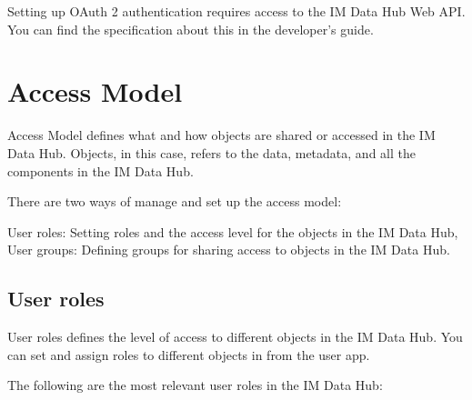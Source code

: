 \documentclass[]{book}
\begin{document}
Setting up OAuth 2 authentication requires access to the IM Data Hub Web API. You can find the specification about this in the developer's guide.

\hypertarget{access-model}{%
\section{Access Model}\label{access-model}}

Access Model defines what and how objects are shared or accessed in the IM Data Hub. Objects, in this case, refers to the data, metadata, and all the components in the IM Data Hub.

There are two ways of manage and set up the access model:

User roles: Setting roles and the access level for the objects in the IM Data Hub,
User groups: Defining groups for sharing access to objects in the IM Data Hub.

\hypertarget{user-roles}{%
\subsection{User roles}\label{user-roles}}

User roles defines the level of access to different objects in the IM Data Hub. You can set and assign roles to different objects in from the user app.

The following are the most relevant user roles in the IM Data Hub:
\end{document}
